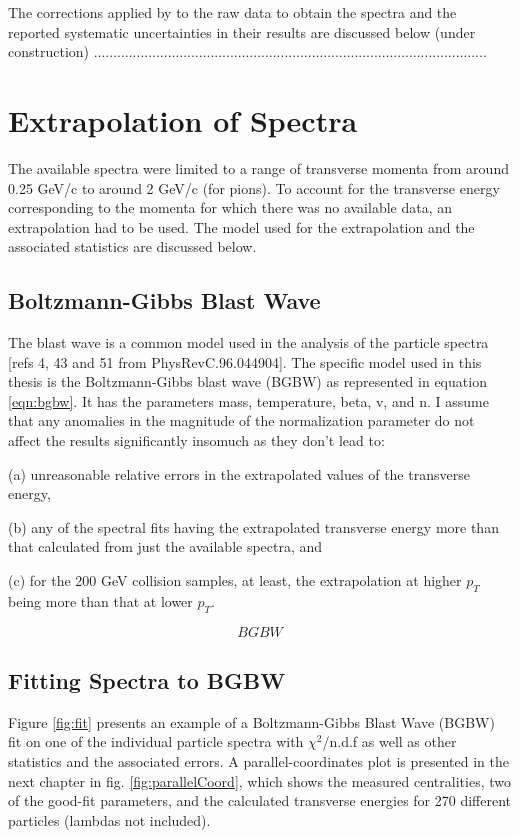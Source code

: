 The corrections applied by \citet{PhysRevC.96.044904} to the raw data to obtain the spectra and the reported systematic uncertainties in their results are discussed below (under construction)
.....................................................................................................

\section{Extrapolation of Spectra}
The available spectra were limited to a range of transverse momenta from around 0.25 GeV/c to around 2 GeV/c (for pions). To account for the transverse energy corresponding to the momenta for which there was no available data, an extrapolation had to be used. The model used for the extrapolation and the associated statistics are discussed below.

\subsection{Boltzmann-Gibbs Blast Wave}
The blast wave is a common model used in the analysis of the particle spectra [refs 4, 43 and 51 from PhysRevC.96.044904]. The specific model used in this thesis is the Boltzmann-Gibbs blast wave (BGBW) as represented in equation \ref{eqn:bgbw}. It has the parameters mass, temperature, beta, v, and n. I assume that any anomalies in the magnitude of the normalization parameter do not affect the results significantly insomuch as they don't lead to: 

(a) unreasonable relative errors in the extrapolated values of the transverse energy,

(b) any of the spectral fits having the extrapolated transverse energy more than that calculated from just the available spectra, and

(c) for the 200 GeV collision samples, at least, the extrapolation at higher $p_{T}$ being more than that at lower $p_{T}$.

	\begin{equation}\label{eqn:BGBW}
	BGBW
	\end{equation}

\subsection{Fitting Spectra to BGBW}
Figure \ref{fig:fit} presents an example of a Boltzmann-Gibbs Blast Wave (BGBW) fit on one of the individual particle spectra with $\chi^{2}$/n.d.f as well as other statistics and the associated errors. A parallel-coordinates plot is presented in the next chapter in fig. \ref{fig:parallelCoord}, which shows the measured centralities, two of the good-fit parameters, and the calculated transverse energies for 270 different particles (lambdas not included).

